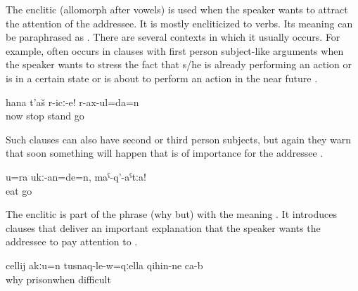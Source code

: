 The enclitic  (allomorph  after vowels) is used when the speaker wants to attract the attention of the addressee. It is mostly encliticized to verbs. Its meaning can be paraphrased as . There are several contexts in which it usually occurs. For example,  often occurs in clauses with first person subject-like arguments when the speaker wants to stress the fact that s/he is already performing an action or is in a certain state or is about to perform an action in the near future .
%
\begin{exe}
	\ex	\label{ex:‎Now wait, I (fem.) am coming minor}
	\gll	hana	t'aš	r-icː-e!	r-ax-ul=da=n\\
		now	stop	stand	go\\
	\glt	{}
\end{exe}

Such clauses can also have second or third person subjects, but again they warn that soon something will happen that is of importance for the addressee .
%
\begin{exe}
	\ex	\label{ex:‎‎[Your sister turned into a monster, she ate people], and she will eat you (masc.), don't go minor}
	\gll	u=ra	ukː-an=de=n,	maˁ-q'-aˁtːa!\\
			eat	go\\
	\glt	{}
\end{exe}

The enclitic is part of the phrase  (why but) with the meaning . It introduces clauses that deliver an important explanation that the speaker wants the addressee to pay attention to .
%
\begin{exe}
	\ex	\label{ex:Because when you are in prison it is difficult minor}
	\gll	cellij	akːu=n	tusnaq-le-w=qːella	qihin-ne	ca-b\\
		why		prisonwhen	difficult	\\
	\glt	{}
\end{exe}

